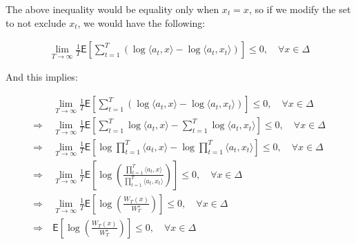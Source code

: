 \documentclass{article}
\begin{document}
The above inequality would be equality only when $x_t = x$, so if we modify the set to not exclude $x_t$, we would have the following:

\begin{align*}
    \lim_{T \to \infty} \frac{1}{T} \mathsf{E} \left[ \sum_{t = 1}^T \left( \log \langle a_t, x \rangle - \log \langle a_t, x_t \rangle \right) \right] \leq 0 ,  \quad \forall x \in \Delta 
\end{align*}

And this implies:

\begin{align*}
    &\lim_{T \to \infty} \frac{1}{T} \mathsf{E} \left[ \sum_{t = 1}^T \left( \log \langle a_t, x \rangle - \log \langle a_t, x_t \rangle \right) \right] \leq 0 ,  \quad \forall x \in \Delta \\
    \Rightarrow \ & \lim_{T \to \infty} \frac{1}{T} \mathsf{E} \left[ \sum_{t=1}^T \log \langle a_t, x \rangle - \sum_{t=1}^T \log \langle a_t, x_t \rangle \right] \leq 0 ,  \quad \forall x \in \Delta \\
    \Rightarrow \ & \lim_{T \to \infty} \frac{1}{T} \mathsf{E} \left[ \log \prod_{t=1}^T \langle a_t, x \rangle - \log \prod_{t=1}^T \langle a_t, x_t \rangle \right] \leq 0 ,  \quad \forall x \in \Delta \\
    \Rightarrow \ & \lim_{T \to \infty} \frac{1}{T} \mathsf{E} \left[ \log \left( \frac{\prod_{t=1}^T \langle a_t, x \rangle}{\prod_{t=1}^T \langle a_t, x_t \rangle} \right) \right] \leq 0 ,  \quad \forall x \in \Delta \\
    \Rightarrow \ & \lim_{T \to \infty} \frac{1}{T} \mathsf{E} \left[ \log \left( \frac{W_T (x)}{W_T^\star} \right) \right] \leq 0 ,  \quad \forall x \in \Delta \\
    \Rightarrow \ & \mathsf{E} \left[ \log \left( \frac{W_T (x)}{W_T^\star} \right) \right] \leq 0 ,  \quad \forall x \in \Delta
\end{align*}
\end{document}
